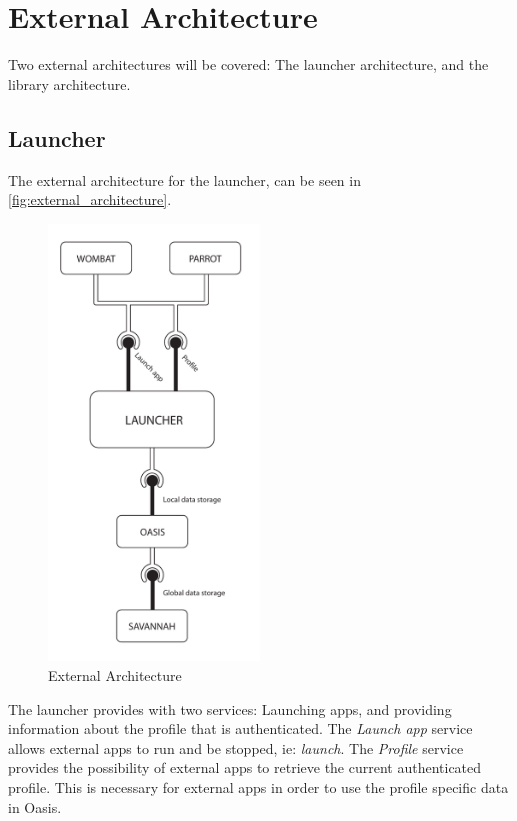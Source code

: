 \section{External Architecture}
Two external architectures will be covered: The launcher architecture, and the \guicomponents[] library architecture.

\subsection{Launcher}
The external architecture for the launcher, can be seen in \autoref{fig:external_architecture}.
\begin{figure}[h]
	\centering
	\includegraphics[width=0.5\textwidth]{gfx/external_architecture.pdf}
	\caption{External Architecture}
	\label{fig:external_architecture}
\end{figure}
The launcher provides with two services: Launching apps, and providing information about the profile that is authenticated. The \textit{Launch app} service allows external apps to run and be stopped, ie: \textit{launch}.
The \textit{Profile} service provides the possibility of external apps to retrieve the current authenticated profile.
This is necessary for external apps in order to use the profile specific data in Oasis.

